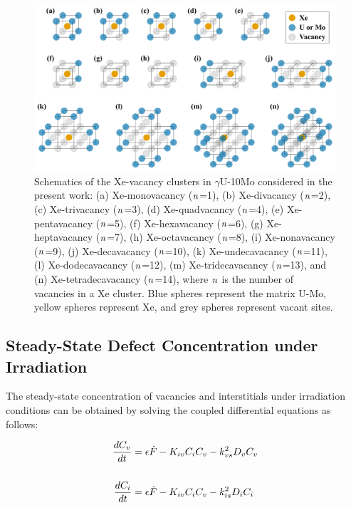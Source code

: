 \documentclass[preprint,12pt]{elsarticle}
\begin{document}
\begin{figure}[hbt!]
\centering
\includegraphics[width=1.0\textwidth]{Fig1.png}
\caption{Schematics of the Xe-vacancy clusters in $\gamma$U-10Mo considered in the present work: (a) Xe-monovacancy ($\it{n}$=1), (b) Xe-divacancy ($\it{n}$=2), (c) Xe-trivacancy ($\it{n}$=3), (d) Xe-quadvacancy ($\it{n}$=4), (e) Xe-pentavacancy ($\it{n}$=5), (f) Xe-hexavacancy ($\it{n}$=6), (g) Xe-heptavacancy ($\it{n}$=7), (h) Xe-octavacancy ($\it{n}$=8), (i) Xe-nonavacancy ($\it{n}$=9), (j) Xe-decavacancy ($\it{n}$=10), (k) Xe-undecavacancy ($\it{n}$=11), (l) Xe-dodecavacancy ($\it{n}$=12), (m) Xe-tridecavacancy ($\it{n}$=13), and (n) Xe-tetradecavacancy ($\it{n}$=14), where $\it{n}$ is the number of vacancies in a Xe cluster. Blue spheres represent the matrix U-Mo, yellow spheres represent Xe, and grey spheres represent vacant sites. }
\label{fig:xeclusters}
\end{figure}

\subsection{Steady-State Defect Concentration under Irradiation}
The steady-state concentration of vacancies and interstitials under irradiation conditions can be obtained by solving the coupled differential equations as follows:

\begin{align} 
\label{eqn:UMoratetheory1}
\frac{dC_{v}}{dt}={}&\epsilon\dot{F}- K_{iv}C_{i}C_{v} - k_{vs}^{2}D_{v}C_{v} \\
\notag\\
\label{eqn:UMoratetheory2}
\frac{dC_{i}}{dt}={}&\epsilon\dot{F} - K_{iv}C_{i}C_{v} - k_{is}^{2}D_{i}C_{i} 
\end{align}
\end{document}
